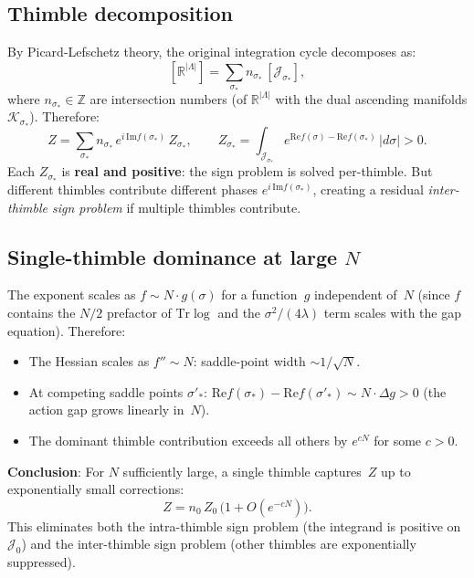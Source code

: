 \documentclass[12pt]{article}
\theoremstyle{definition}
\theoremstyle{remark}
\newcommand{\R}{\mathbb{R}}
\newcommand{\Z}{\mathbb{Z}}
\newcommand{\Tr}{\mathrm{Tr}}
\newcommand{\La}{\Lambda}
\newcommand{\im}{\mathrm{Im}}
\newcommand{\re}{\mathrm{Re}}
\begin{document}
\subsection{Thimble decomposition}

By Picard-Lefschetz theory, the original integration cycle
decomposes as:
\begin{equation}\label{eq:decomp}
  [\R^{|\La|}] = \sum_{\sigma_*} n_{\sigma_*}\,
    [\mathcal{J}_{\sigma_*}],
\end{equation}
where $n_{\sigma_*} \in \Z$ are intersection numbers
(of $\R^{|\La|}$ with the dual ascending manifolds
$\mathcal{K}_{\sigma_*}$). Therefore:
\begin{equation}
  Z = \sum_{\sigma_*} n_{\sigma_*}\,e^{i\,\im f(\sigma_*)}\,
    Z_{\sigma_*}, \qquad
  Z_{\sigma_*} = \int_{\mathcal{J}_{\sigma_*}}
    e^{\re f(\sigma) - \re f(\sigma_*)}\,|d\sigma| > 0.
\end{equation}
Each $Z_{\sigma_*}$ is \textbf{real and positive}: the sign
problem is solved per-thimble. But different thimbles contribute
different phases $e^{i\,\im f(\sigma_*)}$, creating a residual
\emph{inter-thimble sign problem} if multiple thimbles contribute.

\subsection{Single-thimble dominance at large $N$}

The exponent scales as $f \sim N\cdot g(\sigma)$ for a function~$g$
independent of~$N$ (since $f$ contains the $N/2$ prefactor of
$\Tr\log$ and the $\sigma^2/(4\lambda)$ term scales with the
gap equation). Therefore:
\begin{itemize}
\item The Hessian scales as $f'' \sim N$: saddle-point width
  $\sim 1/\sqrt{N}$.
\item At competing saddle points $\sigma'_*$:
  $\re f(\sigma_*) - \re f(\sigma'_*) \sim N\cdot\Delta g > 0$
  (the action gap grows linearly in~$N$).
\item The dominant thimble contribution exceeds all others by
  $e^{cN}$ for some $c > 0$.
\end{itemize}

\textbf{Conclusion}: For $N$ sufficiently large, a single thimble
captures~$Z$ up to exponentially small corrections:
\begin{equation}
  Z = n_0\,Z_0\,\bigl(1 + O(e^{-cN})\bigr).
\end{equation}
This eliminates both the intra-thimble sign problem (the integrand
is positive on $\mathcal{J}_0$) and the inter-thimble sign problem
(other thimbles are exponentially suppressed).
\end{document}
